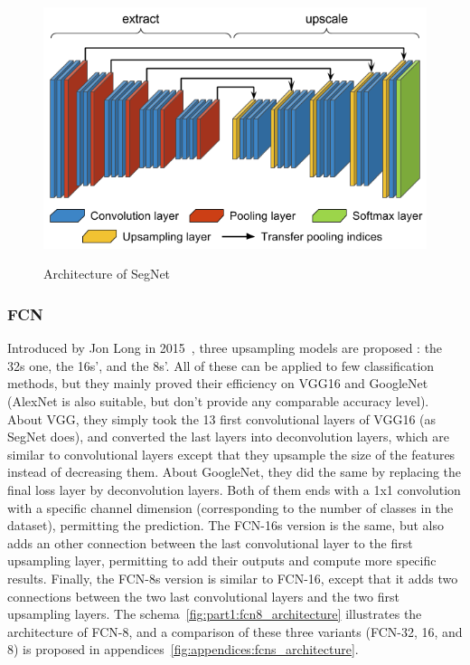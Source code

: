 \begin{figure}[ht!]
  \includegraphics[width=0.8\linewidth,center]{images/part1/segnet_architecture.png}
  \caption{Architecture of SegNet}\textbf{
  \label{fig:part1:segnet_architecture}}
\end{figure}

\subsubsection{FCN} Introduced by Jon Long in 2015~\cite{LONG15}, three upsampling models are proposed : the 32s one, the 16s', and the 8s'. All of these can be applied to few classification methods, but they mainly proved their efficiency on VGG16 and GoogleNet (AlexNet is also suitable, but don't provide any comparable accuracy level). About VGG, they simply took the 13 first convolutional layers of VGG16 (as SegNet does), and converted the last layers into deconvolution layers, which are similar to convolutional layers except that they upsample the size of the features instead of decreasing them. About GoogleNet, they did the same by replacing the final loss layer by deconvolution layers. Both of them ends with a 1x1 convolution with a specific channel dimension (corresponding to the number of classes in the dataset), permitting the prediction. The FCN-16s version is the same, but also adds an other connection between the last convolutional layer to the first upsampling layer, permitting to add their outputs and compute more specific results. Finally, the FCN-8s version is similar to FCN-16, except that it adds two connections between the two last convolutional layers and the two first upsampling layers. The schema~\ref{fig:part1:fcn8_architecture} illustrates the architecture of FCN-8, and a comparison of these three variants (FCN-32, 16, and 8) is proposed in appendices~\ref{fig:appendices:fcns_architecture}.

